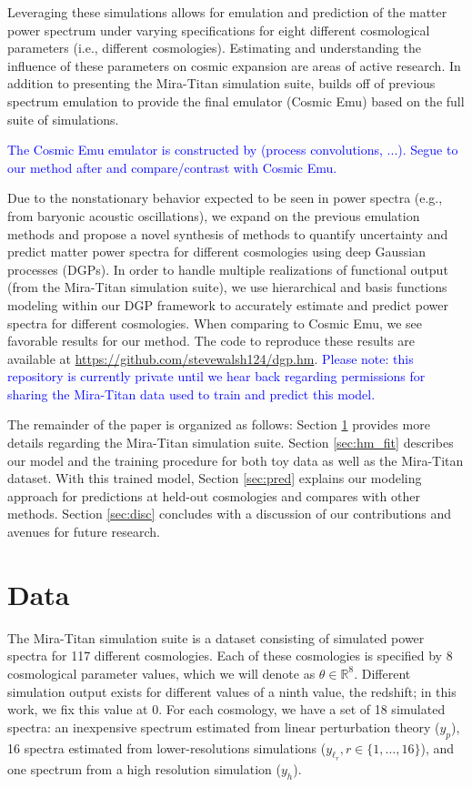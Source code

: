 \documentclass[11pt]{article}
\begin{document}
Leveraging these simulations allows for emulation and prediction of the matter power spectrum under varying specifications for eight different cosmological parameters (i.e., different cosmologies). Estimating and understanding the influence of these parameters on cosmic expansion are areas of active research. In addition to presenting the Mira-Titan simulation suite, \cite{moran2023mira} builds off of previous spectrum emulation \citep{lawrence2017mira} to provide the final emulator (Cosmic Emu) based on the full suite of simulations.

\textcolor{blue}{The Cosmic Emu emulator is constructed by (process convolutions, ...). Segue to our method after and compare/contrast with Cosmic Emu.}

Due to the nonstationary behavior expected to be seen in power spectra (e.g., from baryonic acoustic oscillations), we expand on the previous emulation methods and propose a novel synthesis of methods to quantify uncertainty and predict matter power spectra for different cosmologies using deep Gaussian processes (DGPs). In order to handle multiple realizations of functional output (from the Mira-Titan simulation suite), we use hierarchical and basis functions modeling within our DGP framework to accurately estimate and predict power spectra for different cosmologies. When comparing to Cosmic Emu, we see favorable results for our method. The code to reproduce these results are available at \url{https://github.com/stevewalsh124/dgp.hm}. \textcolor{blue}{Please note: this repository is currently private until we hear back regarding permissions for sharing the Mira-Titan data used to train and predict this model.}

The remainder of the paper is organized as follows: Section \ref{sec:data} provides more details regarding the Mira-Titan simulation suite. Section \ref{sec:hm_fit} describes our model and the training procedure for both toy data as well as the Mira-Titan dataset. With this trained model, Section \ref{sec:pred} explains our modeling approach for predictions at held-out cosmologies and compares with other methods. Section \ref{sec:disc} concludes with a discussion of our contributions and avenues for future research.

\section{Data}
\label{sec:data}

The Mira-Titan simulation suite is a dataset consisting of simulated power spectra for 117 different cosmologies. Each of these cosmologies is specified by 8 cosmological parameter values, which we will denote as $\theta \in \mathbb{R}^8$. Different simulation output exists for different values of a ninth value, the redshift; in this work, we fix this value at 0. For each cosmology, we have a set of 18 simulated spectra: an inexpensive spectrum estimated from linear perturbation theory ($y_p$), 16 spectra estimated from lower-resolutions simulations ($y_{\ell_r}, r \in \{1,\dots,16\}$), and one spectrum from a high resolution simulation ($y_h$). 
\end{document}
